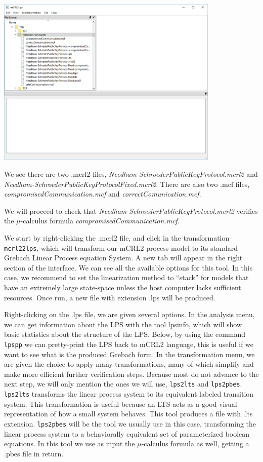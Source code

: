 \documentclass[11pt]{article}
\theoremstyle{definition}
\theoremstyle{plain}
\begin{document}
\includegraphics[width=0.8\textwidth, keepaspectratio]{img/mCRL2/mcrl2-files.png}

We see there are two .mcrl2 files, \textit{Needham-SchroederPublicKeyProtocol.mcrl2} and \textit{Needham-SchroederPublicKeyProtocolFixed.mcrl2}. There are also two .mcf files, \textit{compromisedCommunication.mcf} and \textit{correctComunication.mcf}.

We will proceed to check that \textit{Needham-SchroederPublicKeyProtocol.mcrl2} verifies the $ \mu $-calculus formula \textit{compromisedCommunication.mcf}.

We start by right-clicking the .mcrl2 file, and click in the transformation \texttt{mcrl22lps}, which will transform our mCRL2 process model to its standard Grebach Linear Process equation System. A new tab will appear in the right section of the interface. We can see all the available options for this tool. In this case, we recommend to set the linearization method to ``stack'' for models that have an extremely large state-space unless the host computer lacks sufficient resources. Once run, a new file with extension .lps will be produced.


Right-clicking on the .lps file, we are given several options. In the analysis menu, we can get information about the LPS with the tool lpsinfo, which will show basic statistics about the structure of the LPS. Below, by using the command \texttt{lpspp} we can pretty-print the LPS back to mCRL2 language, this is useful if we want to see what is the produced Grebach form. In the transformation menu, we are given the choice to apply many transformations, many of which simplify and make more efficient further verification steps. Because most do not advance to the next step, we will only mention the ones we will use, \texttt{lps2lts} and \texttt{lps2pbes}.
\texttt{lps2lts} transforms the linear process system to its equivalent labeled transition system. This transformation is useful because an LTS acts as a good visual representation of how a small system behaves. This tool produces a file with .lts extension.
\texttt{lps2pbes} will be the tool we usually use in this case, transforming the linear process system to a behaviorally equivalent set of parameterized boolean equations. In this tool we use as input the $ \mu $-calculus formula as well, getting a .pbes file in return.
\end{document}
